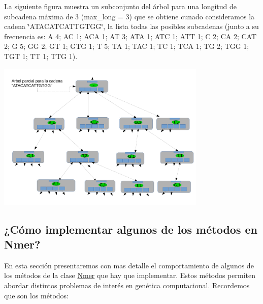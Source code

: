 La siguiente figura muestra un subconjunto del árbol para una longitud de subcadena máxima de 3 (max\+\_\+long = 3) que se obtiene cunado consideramos la cadena \char`\"{}\+A\+T\+A\+C\+A\+T\+C\+A\+T\+T\+G\+T\+G\+G\char`\"{}, la lista todas las posibles subcadenas (junto a su frecuencia es\+: A 4; AC 1; A\+CA 1; AT 3; A\+TA 1; A\+TC 1; A\+TT 1; C 2; CA 2; C\+AT 2; G 5; GG 2; GT 1; G\+TG 1; T 5; TA 1; T\+AC 1; TC 1; T\+CA 1; TG 2; T\+GG 1; T\+GT 1; TT 1; T\+TG 1).

 
\begin{DoxyImage}
\includegraphics[width=10cm]{ktree_cadena}
\caption{Cadena de A\+DN $<$A\+T\+A\+C\+A\+T\+C\+A\+T\+T\+G\+T\+GG$>$ representada como un ktree}
\end{DoxyImage}
\hypertarget{index_otrosMetodos}{}\subsection{¿\+Cómo implementar algunos de los métodos en Nmer?}\label{index_otrosMetodos}
En esta sección presentaremos con mas detalle el comportamiento de algunos de los métodos de la clase \hyperlink{classNmer}{Nmer} que hay que implementar. Estos métodos permiten abordar distintos problemas de interés en genética computacional. Recordemos que son los métodos\+:


